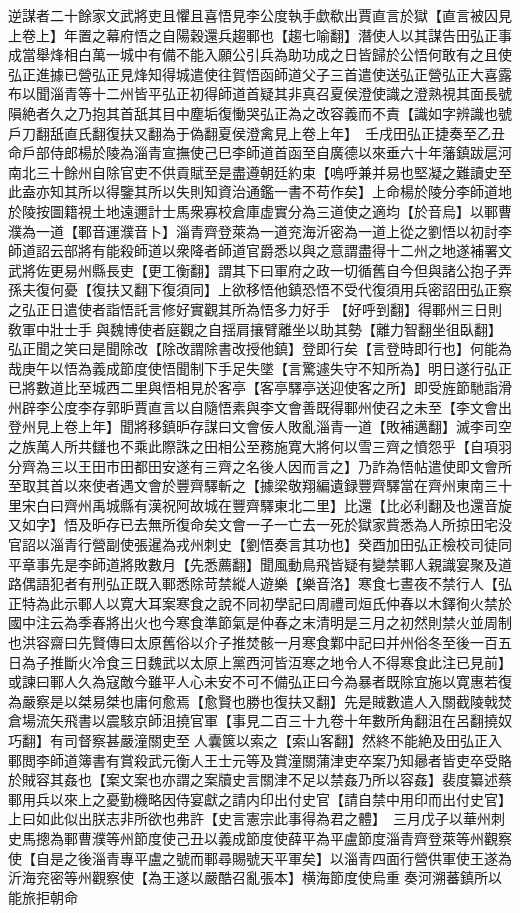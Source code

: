 逆謀者二十餘家文武將吏且懼且喜悟見李公度執手歔欷出賈直言於獄【直言被囚見上卷上】年置之幕府悟之自陽穀還兵趨鄆也【趨七喻翻】潛使人以其謀告田弘正事成當舉烽相白萬一城中有備不能入願公引兵為助功成之日皆歸於公悟何敢有之且使弘正進據已營弘正見烽知得城遣使往賀悟函師道父子三首遣使送弘正營弘正大喜露布以聞淄青等十二州皆平弘正初得師道首疑其非真召夏侯澄使識之澄熟視其面長號隕絶者久之乃抱其首舐其目中塵垢復慟哭弘正為之改容義而不責【識如字辨識也號戶刀翻舐直氏翻復扶又翻為于偽翻夏侯澄禽見上卷上年】　壬戌田弘正捷奏至乙丑命戶部侍郎楊於陵為淄青宣撫使己巳李師道首函至自廣德以來垂六十年藩鎮跋扈河南北三十餘州自除官吏不供貢賦至是盡遵朝廷約束【嗚呼兼并易也堅凝之難讀史至此盍亦知其所以得鑒其所以失則知資治通鑑一書不苟作矣】上命楊於陵分李師道地於陵按圖籍視土地遠邇計士馬衆寡校倉庫虚實分為三道使之適均【於音烏】以鄆曹濮為一道【鄆音運濮音卜】淄青齊登萊為一道兖海沂密為一道上從之劉悟以初討李師道詔云部將有能殺師道以衆降者師道官爵悉以與之意謂盡得十二州之地遂補署文武將佐更易州縣長吏【更工衡翻】謂其下曰軍府之政一切循舊自今但與諸公抱子弄孫夫復何憂【復扶又翻下復須同】上欲移悟他鎮恐悟不受代復須用兵密詔田弘正察之弘正日遣使者詣悟託言修好實觀其所為悟多力好手【好呼到翻】得鄆州三日則敎軍中壯士手與魏博使者庭觀之自揺肩攘臂離坐以助其勢【離力智翻坐徂臥翻】弘正聞之笑曰是聞除改【除改謂除書改授他鎮】登即行矣【言登時即行也】何能為哉庚午以悟為義成節度使悟聞制下手足失墜【言驚遽失守不知所為】明日遂行弘正已將數道比至城西二里與悟相見於客亭【客亭驛亭送迎使客之所】即受旌節馳詣滑州辟李公度李存郭昈賈直言以自隨悟素與李文會善既得鄆州使召之未至【李文會出登州見上卷上年】聞將移鎮昈存謀曰文會佞人敗亂淄青一道【敗補邁翻】滅李司空之族萬人所共讎也不乘此際誅之田相公至務施寛大將何以雪三齊之憤怨乎【自項羽分齊為三以王田市田都田安遂有三齊之名後人因而言之】乃詐為悟帖遣使即文會所至取其首以來使者遇文會於豐齊驛斬之【據梁敬翔編遺録豐齊驛當在齊州東南三十里宋白曰齊州禹城縣有漢祝阿故城在豐齊驛東北二里】比還【比必利翻及也還音旋又如字】悟及昈存已去無所復命矣文會一子一亡去一死於獄家貲悉為人所掠田宅没官詔以淄青行營副使張暹為戎州刺史【劉悟奏言其功也】癸酉加田弘正檢校司徒同平章事先是李師道將敗數月【先悉薦翻】聞風動鳥飛皆疑有變禁鄆人親識宴聚及道路偶語犯者有刑弘正既入鄆悉除苛禁縱人遊樂【樂音洛】寒食七晝夜不禁行人【弘正特為此示鄆人以寛大耳案寒食之說不同初學記曰周禮司烜氏仲春以木鐸徇火禁於國中注云為季春將出火也今寒食準節氣是仲春之末清明是三月之初然則禁火並周制也洪容齋曰先賢傳曰太原舊俗以介子推焚骸一月寒食鄴中記曰并州俗冬至後一百五日為子推斷火冷食三日魏武以太原上黨西河皆沍寒之地令人不得寒食此注已見前】或諫曰鄆人久為寇敵今雖平人心未安不可不備弘正曰今為暴者既除宜施以寛惠若復為嚴察是以桀易桀也庸何愈焉【愈賢也勝也復扶又翻】先是賊數遣人入關截陵戟焚倉場流矢飛書以震駭京師沮撓官軍【事見二百三十九卷十年數所角翻沮在呂翻撓奴巧翻】有司督察甚嚴潼關吏至人囊篋以索之【索山客翻】然終不能絶及田弘正入鄆閲李師道簿書有賞殺武元衡人王士元等及賞潼關蒲津吏卒案乃知曏者皆吏卒受賂於賊容其姦也【案文案也亦謂之案牘史言關津不足以禁姦乃所以容姦】裴度纂述蔡鄆用兵以來上之憂勤機略因侍宴獻之請内印出付史官【請自禁中用印而出付史官】上曰如此似出朕志非所欲也弗許【史言憲宗此事得為君之體】　三月戊子以華州刺史馬摠為鄆曹濮等州節度使己丑以義成節度使薛平為平盧節度淄青齊登萊等州觀察使【自是之後淄青專平盧之號而鄆尋賜號天平軍矣】以淄青四面行營供軍使王遂為沂海兖密等州觀察使【為王遂以嚴酷召亂張本】横海節度使烏重奏河溯蕃鎮所以能旅拒朝命

